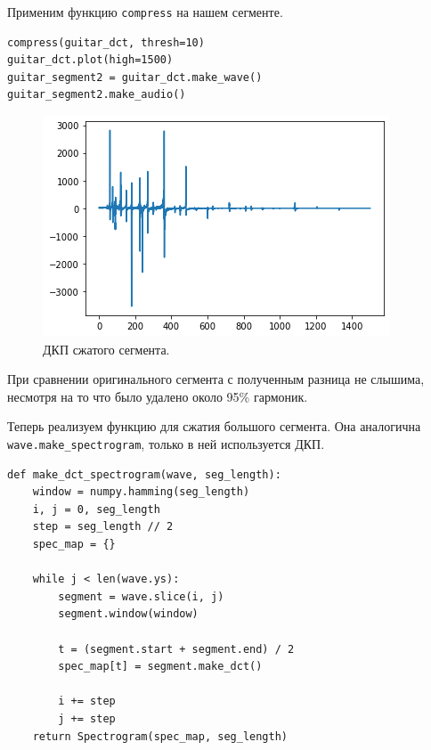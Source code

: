 \documentclass[a4paper, 14pt]{extarticle}
\begin{document}
    Применим функцию \texttt{compress} на нашем сегменте.

    \begin{lstlisting}[caption= Сжатие сегмента., label={lst:task2_dct_compress}]
compress(guitar_dct, thresh=10)
guitar_dct.plot(high=1500)
guitar_segment2 = guitar_dct.make_wave()
guitar_segment2.make_audio()    \end{lstlisting}

    \begin{figure}[h]
        \centering
        \includegraphics[width=0.8\linewidth]{resources/Images/task2_dct_compress}
        \caption{ДКП сжатого сегмента.}
        \label{fig:task2_dct_compress}
    \end{figure}

    При сравнении оригинального сегмента с полученным разница не слышима, несмотря на то что было удалено около 95\%
    гармоник.

    Теперь реализуем функцию для сжатия большого сегмента. Она аналогична \texttt{wave.make\_spectrogram}, только в ней
    используется ДКП.

    \begin{lstlisting}[caption= Функция \texttt{make\_dct\_spectrogram} для сжатия \texttt{wave}., label={lst:task2_fun2}]
def make_dct_spectrogram(wave, seg_length):
    window = numpy.hamming(seg_length)
    i, j = 0, seg_length
    step = seg_length // 2
    spec_map = {}

    while j < len(wave.ys):
        segment = wave.slice(i, j)
        segment.window(window)

        t = (segment.start + segment.end) / 2
        spec_map[t] = segment.make_dct()

        i += step
        j += step
    return Spectrogram(spec_map, seg_length)    \end{lstlisting}
\end{document}
